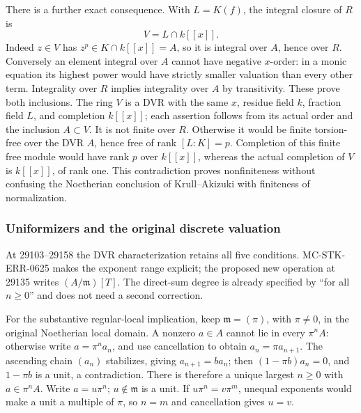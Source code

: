 There is a further exact consequence. With \(L=K(f)\), the integral closure of \(R\) is \[
 V=L\cap k[[x]].
\] Indeed \(z\in V\) has \(z^p\in K\cap k[[x]]=A\), so it is integral over \(A\), hence over \(R\). Conversely an element integral over \(A\) cannot have negative \(x\)-order: in a monic equation its highest power would have strictly smaller valuation than every other term. Integrality over \(R\) implies integrality over \(A\) by transitivity. These prove both inclusions. The ring \(V\) is a DVR with the same \(x\), residue field \(k\), fraction field \(L\), and completion \(k[[x]]\); each assertion follows from its actual order and the inclusion \(A\subset V\). It is not finite over \(R\). Otherwise it would be finite torsion-free over the DVR \(A\), hence free of rank \([L:K]=p\). Completion of this finite free module would have rank \(p\) over \(k[[x]]\), whereas the actual completion of \(V\) is \(k[[x]]\), of rank one. This contradiction proves nonfiniteness without confusing the Noetherian conclusion of Krull--Akizuki with finiteness of normalization.

\subsubsection{Uniformizers and the original discrete valuation}\label{algebra-proof-028-uniformizers-and-the-original-discrete-valuation}

At 29103--29158 the DVR characterization retains all five conditions. MC-STK-ERR-0625 makes the exponent range explicit; the proposed new operation at 29135 writes \((A/\mathfrak m)[T]\). The direct-sum degree is already specified by ``for all \(n\ge0\)'' and does not need a second correction.

For the substantive regular-local implication, keep \(\mathfrak m=(\pi)\), with \(\pi\ne0\), in the original Noetherian local domain. A nonzero \(a\in A\) cannot lie in every \(\pi^nA\): otherwise write \(a=\pi^n a_n\), and use cancellation to obtain \(a_n=\pi a_{n+1}\). The ascending chain \((a_n)\) stabilizes, giving \(a_{n+1}=b a_n\); then \((1-\pi b)a_n=0\), and \(1-\pi b\) is a unit, a contradiction. There is therefore a unique largest \(n\ge0\) with \(a\in\pi^nA\). Write \(a=u\pi^n\); \(u\notin\mathfrak m\) is a unit. If \(u\pi^n=v\pi^m\), unequal exponents would make a unit a multiple of \(\pi\), so \(n=m\) and cancellation gives \(u=v\).

